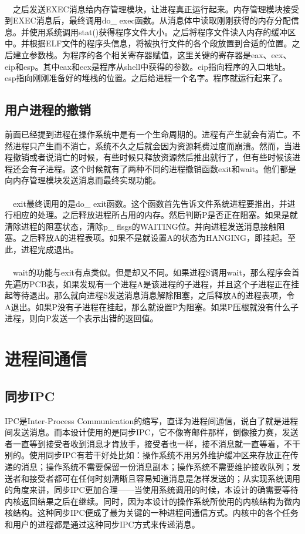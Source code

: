 \documentclass[UTF8,nofonts,cs4size]{ctexrep}
\begin{document}
\paragraph{}
\indent \ \ 之后发送EXEC消息给内存管理模块，让进程真正运行起来。内存管理模块接受到EXEC消息后，最终调用do\_ exec函数。从消息体中读取刚刚获得的内存分配信息。并使用系统调用stat()获得程序文件大小。之后将程序文件读入内存的缓冲区中。并根据ELF文件的程序头信息，将被执行文件的各个段放置到合适的位置。之后建立参数栈。为程序的各个相关寄存器赋值，这里关键的寄存器是eax、ecx、eip和esp。其中eax和ecx是程序从shell中获得的参数。eip指向程序的入口地址。esp指向刚刚准备好的堆栈的位置。之后给进程一个名字。程序就运行起来了。
\subsection{用户进程的撤销}
前面已经提到进程在操作系统中是有一个生命周期的。进程有产生就会有消亡。不然进程只产生而不消亡，系统不久之后就会因为资源耗费过度而崩溃。然而，当进程撤销或者说消亡的时候，有些时候只释放资源然后推出就行了，但有些时候该进程还会有子进程。这个时候就有了两种不同的进程撤销函数exit和wait。他们都是向内存管理模块发送消息而最终实现功能。
\paragraph{}
\indent \ \ 
exit最终调用的是do\_ exit函数。这个函数首先告诉文件系统进程要推出，并进行相应的处理。之后释放进程所占用的内存。然后判断P是否正在阻塞。如果是就清除进程的阻塞状态，清除p\_ flsgs的WAITING位。并向进程发送消息接触阻塞。之后释放A的进程表项。如果不是就设置A的状态为HANGING，即挂起。至此，进程完成退出。
\paragraph{}
\indent \ \ wait的功能与exit有点类似。但是却又不同。如果进程S调用wait，那么程序会首先遍历PCB表，如果发现有一个进程A是该进程的子进程，并且这个子进程正在挂起等待退出。那么就向进程S发送消息消息解除阻塞，之后释放A的进程表项，令A退出。如果P没有子进程在挂起，那么就设置P为阻塞。如果P压根就没有什么子进程，则向P发送一个表示出错的返回值。
\section{进程间通信}
\subsection{同步IPC}
IPC是Inter-Process Communication的缩写，直译为进程间通信，说白了就是进程间发送消息。而本设计使用的是同步IPC，它不像寄邮件那样，倒像接力赛，发送者一直等到接受者收到消息才肯放手，接受者也一样，接不消息就一直等着，不干别的。使用同步IPC有若干好处比如：操作系统不用另外维护缓冲区来存放正在传递的消息；操作系统不需要保留一份消息副本；操作系统不需要维护接收队列；发送者和接受者都可在任何时刻清晰且容易知道消息是怎样发送的；从实现系统调用的角度来讲，同步IPC更加合理——当使用系统调用的时候，本设计的确需要等待内核返回结果之后在继续。同时，因为本设计的操作系统所使用的内核结构为微内核结构。这种同步IPC便成了最为关键的一种进程间通信方式。内核中的各个任务和用户的进程都是通过这种同步IPC方式来传递消息。
\end{document}
